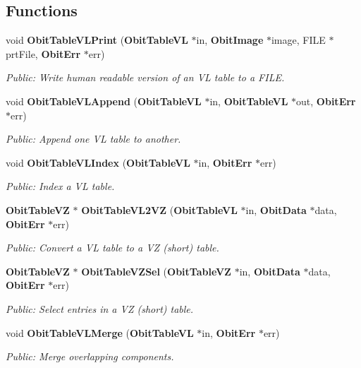 \subsection*{Functions}
\begin{CompactItemize}
\item 
void {\bf Obit\-Table\-VLPrint} ({\bf Obit\-Table\-VL} $\ast$in, {\bf Obit\-Image} $\ast$image, FILE $\ast$prt\-File, {\bf Obit\-Err} $\ast$err)
\begin{CompactList}\small\item\em Public: Write human readable version of an VL table to a FILE. \item\end{CompactList}\item 
void {\bf Obit\-Table\-VLAppend} ({\bf Obit\-Table\-VL} $\ast$in, {\bf Obit\-Table\-VL} $\ast$out, {\bf Obit\-Err} $\ast$err)
\begin{CompactList}\small\item\em Public: Append one VL table to another. \item\end{CompactList}\item 
void {\bf Obit\-Table\-VLIndex} ({\bf Obit\-Table\-VL} $\ast$in, {\bf Obit\-Err} $\ast$err)
\begin{CompactList}\small\item\em Public: Index a VL table. \item\end{CompactList}\item 
{\bf Obit\-Table\-VZ} $\ast$ {\bf Obit\-Table\-VL2VZ} ({\bf Obit\-Table\-VL} $\ast$in, {\bf Obit\-Data} $\ast$data, {\bf Obit\-Err} $\ast$err)
\begin{CompactList}\small\item\em Public: Convert a VL table to a VZ (short) table. \item\end{CompactList}\item 
{\bf Obit\-Table\-VZ} $\ast$ {\bf Obit\-Table\-VZSel} ({\bf Obit\-Table\-VZ} $\ast$in, {\bf Obit\-Data} $\ast$data, {\bf Obit\-Err} $\ast$err)
\begin{CompactList}\small\item\em Public: Select entries in a VZ (short) table. \item\end{CompactList}\item 
void {\bf Obit\-Table\-VLMerge} ({\bf Obit\-Table\-VL} $\ast$in, {\bf Obit\-Err} $\ast$err)
\begin{CompactList}\small\item\em Public: Merge overlapping components. \item\end{CompactList}\item 

\end{CompactItemize}
